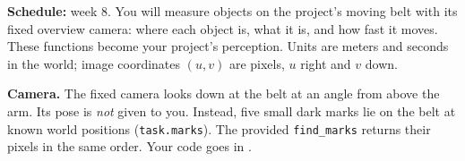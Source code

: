 

\textbf{Schedule:} week 8. You will measure objects on the project's moving
belt with its fixed overview camera: where each object is, what it is, and
how fast it moves. These functions become your project's perception. Units
are meters and seconds in the world; image coordinates $(u,v)$ are pixels,
$u$ right and $v$ down.

\textbf{Camera.} The fixed camera looks down at the belt at an angle from
above the arm. Its pose is \emph{not} given to you. Instead, five small dark
marks lie on the belt at known world positions (\texttt{task.marks}). The
provided \texttt{find\_marks} returns their pixels in the same order.
Your code goes in .

